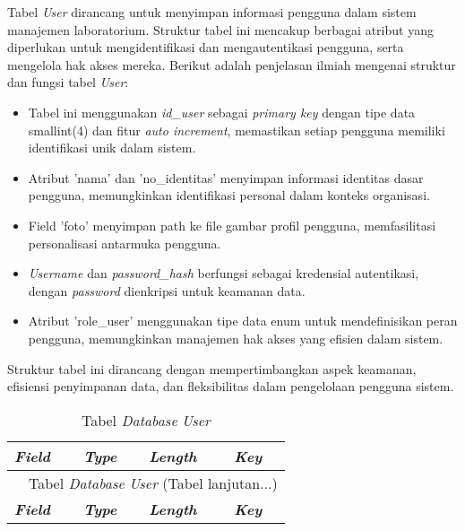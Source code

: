 \begin{enumerate}
	      Tabel \textit{User} dirancang untuk menyimpan informasi pengguna dalam sistem manajemen laboratorium. Struktur tabel ini mencakup berbagai atribut yang diperlukan untuk mengidentifikasi dan mengautentikasi pengguna, serta mengelola hak akses mereka. Berikut adalah penjelasan ilmiah mengenai struktur dan fungsi tabel \textit{User}:

	      \begin{itemize}
		      \item Tabel ini menggunakan \textit{id\_user} sebagai \textit{primary key} dengan tipe data smallint(4) dan fitur \textit{auto increment}, memastikan setiap pengguna memiliki identifikasi unik dalam sistem.
		      \item Atribut 'nama' dan 'no\_identitas' menyimpan informasi identitas dasar pengguna, memungkinkan identifikasi personal dalam konteks organisasi.
		      \item Field 'foto' menyimpan path ke file gambar profil pengguna, memfasilitasi personalisasi antarmuka pengguna.
		      \item \textit{Username} dan \textit{password\_hash} berfungsi sebagai kredensial autentikasi, dengan \textit{password} dienkripsi untuk keamanan data.
		      \item Atribut 'role\_user' menggunakan tipe data enum untuk mendefinisikan peran pengguna, memungkinkan manajemen hak akses yang efisien dalam sistem.
	      \end{itemize}

	      Struktur tabel ini dirancang dengan mempertimbangkan aspek keamanan, efisiensi penyimpanan data, dan fleksibilitas dalam pengelolaan pengguna sistem.

		      {
			      \fontsize{10}{12}\selectfont
			      \begin{longtable}{l l l l}
				      \caption{Tabel \textit{\textit{Database}} \textit{User}}
				      \label{admin}                                                                                                          \\
				      \hline
				      \textbf{\textit{Field}} & \textbf{\textit{Type}} & \textbf{\textit{Length}} & \textbf{\textit{Key}}                    \\
				      \hline
				      \endfirsthead

				      \multicolumn{4}{c}{\tablename\ \thetable\ {Tabel \textit{\textit{Database}} \textit{User}} \space (Tabel lanjutan...)} \\
				      \hline
				      \textbf{\textit{Field}} & \textbf{\textit{Type}} & \textbf{\textit{Length}} & \textbf{\textit{Key}}                    \\
				      \hline
				      \endhead


\end{longtable}}
\end{enumerate}
